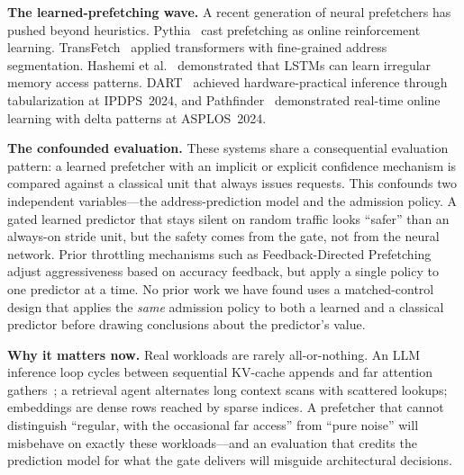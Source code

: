 \documentclass[conference]{IEEEtran}
\begin{document}
\textbf{The learned-prefetching wave.}
A recent generation of neural prefetchers has pushed beyond heuristics.
Pythia~\cite{pythia} cast prefetching as online reinforcement learning.
TransFetch~\cite{transfetch} applied transformers with fine-grained address
segmentation. Hashemi et al.~\cite{hashemi2018} demonstrated that LSTMs
can learn irregular memory access patterns.
DART~\cite{dart} achieved hardware-practical inference through
tabularization at IPDPS~2024, and Pathfinder~\cite{pathfinder} demonstrated
real-time online learning with delta patterns at ASPLOS~2024.

\textbf{The confounded evaluation.}
These systems share a consequential evaluation pattern: a learned prefetcher
with an implicit or explicit confidence mechanism is compared against a
classical unit that always issues requests. This confounds two independent
variables---the address-prediction model and the admission policy. A gated
learned predictor that stays silent on random traffic looks ``safer'' than an
always-on stride unit, but the safety comes from the gate, not from the
neural network. Prior throttling mechanisms such as Feedback-Directed
Prefetching~\cite{fdp2007} adjust aggressiveness based on accuracy feedback,
but apply a single policy to one predictor at a time.
No prior work we have found uses a matched-control design that applies the
\emph{same} admission policy to both a learned and a classical predictor
before drawing conclusions about the predictor's value.

\textbf{Why it matters now.}
Real workloads are rarely all-or-nothing. An LLM inference loop cycles
between sequential KV-cache appends and far attention
gathers~\cite{kwon2023vllm,pope2023}; a retrieval agent alternates long
context scans with scattered lookups; embeddings are dense rows reached by
sparse indices. A prefetcher that cannot distinguish ``regular, with the
occasional far access'' from ``pure noise'' will misbehave on exactly these
workloads---and an evaluation that credits the prediction model for what the
gate delivers will misguide architectural decisions.
\end{document}
